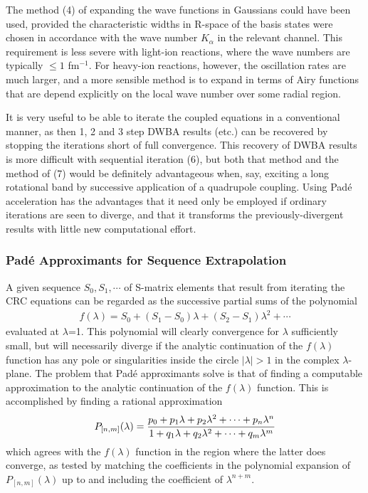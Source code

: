\documentclass[11pt,a4paper]{article}
\begin{document}
The method (4) of expanding the wave functions in Gaussians
could have been used, provided the characteristic widths in R-space
of the basis states were chosen in accordance with the wave number
$K _\alpha$ in the relevant channel.
This requirement is less severe with light-ion reactions, where the
wave numbers are typically $ \leq 1$ fm$^{-1}$.
For heavy-ion reactions, however, the oscillation rates are much larger,
and a more sensible method is to expand in terms of Airy functions
that are depend explicitly on the local wave number over some radial region.

It is very useful to be able to iterate the coupled equations in
a conventional manner, as then 1, 2 and 3 step DWBA results (etc.)
can be recovered by stopping the iterations short of full convergence.
This recovery of DWBA results is more difficult with sequential iteration (6),
but both that method and the method of (7)
would be definitely advantageous when, say, exciting a long
rotational band by successive application of a quadrupole coupling.
Using Pad\'e acceleration has the advantages that it need only
be employed if ordinary iterations are seen to diverge,
and that it transforms the previously-divergent results
with little new computational effort.
\subsubsection{Pad\'e Approximants for Sequence Extrapolation}

A given sequence $S_0 , S_1 , \cdots $ of S-matrix elements
that result from iterating the CRC equations
can be regarded as the successive partial sums of the polynomial
\begin{eqnarray}
  f(\lambda) = S_0 + (S_1 - S_0) \lambda
                   + (S_2 - S_1) \lambda ^ 2 + \cdots
\end{eqnarray}
evaluated at $\lambda$=1.
This polynomial will clearly convergence for $\lambda$ sufficiently small,
but will necessarily diverge if the analytic continuation of the
$f (\lambda) $ function has any pole or singularities inside the circle
$ | \lambda |> 1 $ in the complex $\lambda$-plane.
The problem that Pad\'e approximants solve is that of finding a computable
approximation to the analytic continuation of the $f (\lambda) $ function.
This is accomplished by finding a rational approximation
\begin{eqnarray}
 P_{[n,m]} (\lambda) = {p_0 + p_1 \lambda + p_2 \lambda^2 + \cdots + p_n \lambda^n
                  \over
                   1       + q_1 \lambda + q_2 \lambda^2 + \cdots + q_m \lambda^m }
\end{eqnarray}
which agrees with the $f(\lambda)$ function in the region where the latter
does converge, as tested by matching the coefficients in the polynomial
expansion of $ P_{[n,m]} (\lambda) $ up to and including the coefficient of
$ \lambda^{n+m} $.
\end{document}
